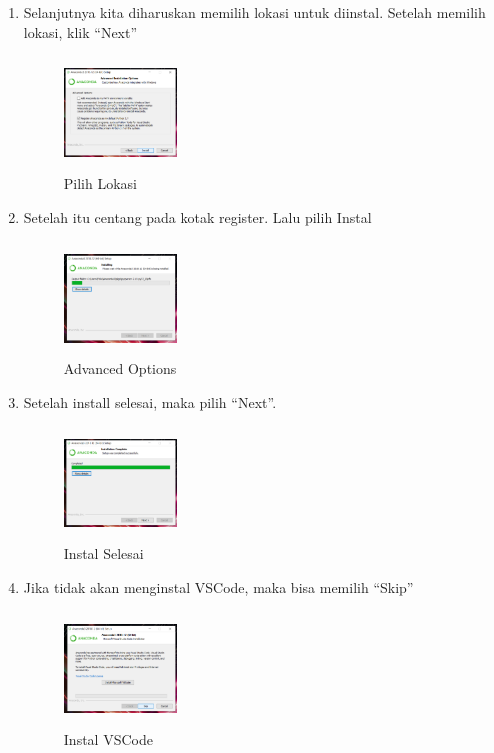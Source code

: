 \begin{enumerate}
\item Selanjutnya kita diharuskan memilih lokasi untuk diinstal. Setelah memilih lokasi, klik “Next”
\begin{figure}[!htbp]
    \centering
    \includegraphics[width=3cm,height=3cm]{figures/5.png}
    \caption{Pilih Lokasi}
    \label{lokasi}
    \end{figure}

\item Setelah itu centang pada kotak register. Lalu pilih Instal
\begin{figure}[!htbp]
    \centering
    \includegraphics[width=3cm,height=3cm]{figures/6.png}
    \caption{Advanced Options}
    \label{options}
    \end{figure}

\item Setelah install selesai, maka pilih “Next”.
\begin{figure}[!htbp]
    \centering
    \includegraphics[width=3cm,height=3cm]{figures/7.png}
    \caption{Instal Selesai}
    \label{instal}
    \end{figure}

\item Jika tidak akan menginstal VSCode, maka bisa memilih “Skip”
\begin{figure}[!htbp]
    \centering
    \includegraphics[width=3cm,height=3cm]{figures/8.png}
    \caption{Instal VSCode}
    \label{vscode}
    \end{figure}


\end{enumerate}
